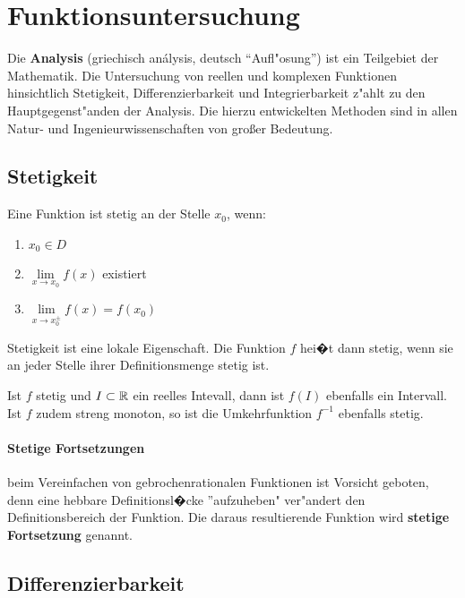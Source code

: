 \chapter{Funktionsuntersuchung}

Die \textbf{Analysis} (griechisch  análysis, deutsch "`Aufl"osung"') ist ein Teilgebiet der Mathematik.  Die Untersuchung von reellen und komplexen Funktionen hinsichtlich Stetigkeit, Differenzierbarkeit und Integrierbarkeit z"ahlt zu den Hauptgegenst"anden der Analysis. Die hierzu entwickelten Methoden sind in allen Natur- und Ingenieurwissenschaften von großer Bedeutung.\\

\section{Stetigkeit}

\begin{Definition}
Eine Funktion ist stetig an der Stelle $x_{0}$, wenn:
\begin{enumerate}
\item $x_{0}\in D$
\item $\lim\limits_{x \rightarrow x_{0}} {f(x)}$ existiert 
\item $\lim\limits_{x \rightarrow x_{0}^{\pm}} {f(x)}=f(x_{0})$\\
\end{enumerate}
\end{Definition}
Stetigkeit ist eine lokale Eigenschaft. Die Funktion $f$ hei�t dann stetig, wenn sie an jeder Stelle ihrer Definitionsmenge stetig ist.

\begin{Bemerkung}
Ist $f$ stetig und $I\subset \mathbb{R}$ ein reelles Intevall, dann ist $f(I)$ ebenfalls ein Intervall. Ist $f$ zudem streng monoton, so ist die Umkehrfunktion $f^{-1}$ ebenfalls stetig.
\end{Bemerkung}

\subsubsection{Stetige Fortsetzungen}

beim Vereinfachen von gebrochenrationalen Funktionen ist Vorsicht geboten, denn eine hebbare Definitionsl�cke ''aufzuheben" ver"andert den Definitionsbereich der Funktion. Die daraus resultierende Funktion wird \textbf{stetige Fortsetzung} genannt.

\section{Differenzierbarkeit}

